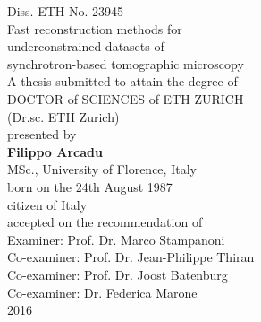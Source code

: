{%
\centering
\begin{center}
{\fontsize{12}{4}\selectfont \color{black}Diss. ETH No. 23945}\\[4em]
{\fontsize{20}{2}\selectfont \color{darkcerulean}Fast reconstruction methods for}\\[0.7em]
{\fontsize{20}{2}\selectfont \color{darkcerulean}underconstrained datasets of}\\[0.7em]
{\fontsize{20}{2}\selectfont \color{darkcerulean}synchrotron-based tomographic microscopy} \\[4em]
{\fontsize{12}{2}\selectfont \color{black}A thesis submitted to attain the degree of}\\[0.4em]
{\fontsize{12}{2}\selectfont \color{black}DOCTOR of SCIENCES of ETH ZURICH}\\[0.4em]
{\fontsize{12}{2}\selectfont \color{black}(Dr.sc. ETH Zurich)}\\[2em]
{\fontsize{12}{2}\selectfont \color{black}presented by}\\[2em]
{\fontsize{12}{2}\selectfont \color{black}\textbf{Filippo Arcadu}}\\[2em]
{\fontsize{12}{2}\selectfont \color{black}MSc., University of Florence, Italy}\\[0.4em]
{\fontsize{12}{2}\selectfont \color{black}born on the 24th August 1987}\\[0.4em]
{\fontsize{12}{2}\selectfont \color{black}citizen of Italy}\\[4em]
{\fontsize{12}{2}\selectfont \color{black}accepted on the recommendation of}\\[0.8em]
{\fontsize{12}{2}\selectfont \color{black}Examiner: Prof. Dr. Marco Stampanoni}\\[0.4em]
{\fontsize{12}{2}\selectfont \color{black}Co-examiner: Prof. Dr. Jean-Philippe Thiran}\\[0.4em]
{\fontsize{12}{2}\selectfont \color{black}Co-examiner: Prof. Dr. Joost Batenburg}\\[0.4em]
{\fontsize{12}{2}\selectfont \color{black}Co-examiner: Dr. Federica Marone}\\[2em]
{\fontsize{12}{2}\selectfont \color{black}2016}
\end{center} 

\thispagestyle{empty}
}
